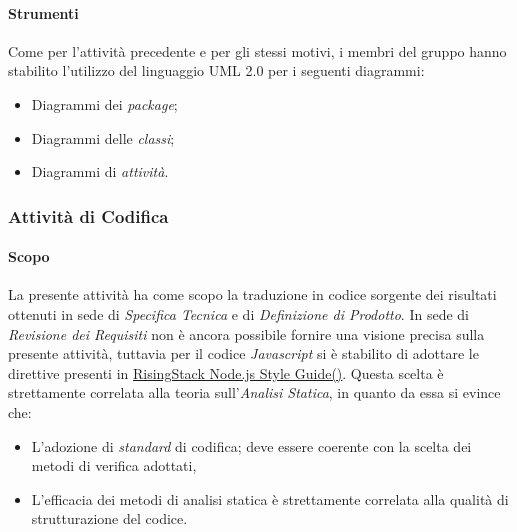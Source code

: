 		 
		        \paragraph*{Strumenti}
		        Come per l'attivit\`a precedente e per gli stessi motivi, i membri del gruppo hanno stabilito l'utilizzo del linguaggio UML 2.0 per i seguenti
		        diagrammi:
		        \begin{itemize}
			\item Diagrammi dei \textit{package}; 
			\item Diagrammi delle \textit{classi};	
			\item Diagrammi di \textit{attivit\`a}.
		        \end{itemize}
			 
		
		\subsubsection{Attività di Codifica}
                \paragraph*{Scopo}
                La presente attivit\`a ha come scopo la traduzione in codice sorgente dei risultati ottenuti in sede
                di \textit{Specifica Tecnica} e di \textit{Definizione di Prodotto}.
                In sede di \textit{Revisione dei Requisiti} non \`e ancora possibile fornire una visione precisa sulla presente attivit\`a,
                tuttavia per il codice \textit{Javascript} %
                si \`e stabilito di adottare le direttive presenti in \href{https://github.com/RisingStack/node-style-guide/blob/master/README.md}{RisingStack Node.js Style Guide()}.
                Questa scelta \`e strettamente correlata alla teoria sull'\textit{Analisi Statica}, in quanto da essa si evince che:
                \begin{itemize}
		  \item L’adozione di \textit{standard} di codifica;
                    deve essere coerente con la scelta dei metodi di verifica adottati,         
		  \item L’efficacia dei metodi di analisi statica \`e strettamente correlata alla qualit\`a di strutturazione del codice.
                \end{itemize}
                
